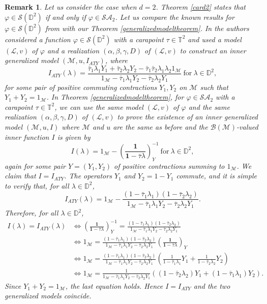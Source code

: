\documentclass[11pt, reqno]{amsart}
\newtheorem{remark}[theorem]{Remark}
\newcommand\1{\boldsymbol {1}}
\newcommand\be{\begin{equation}}
\newcommand\ee{\end{equation}}
\newcommand\m{\mathcal{M}}
\newcommand\lam{\lambda}
\newcommand{\T}{\mathbb{T}}
\newcommand{\D}{\mathbb{D}}
\newcommand{\ph}{\varphi}
\numberwithin{equation}{section}
\begin{document}
\begin{remark}\label{case-d=2} \rm Let us consider the case when $d=2$. Theorem \ref{card2} states that $\ph\in\mathcal{S}(\D^2)$ if and only if $\ph\in\mathcal{SA}_2$. Let us compare the known results for $\ph\in\mathcal{S}(\D^2)$ from \cite{ATY2} with our Theorem \ref{generalizedmodeltheorem}. In \cite[Theorem 3.6]{ATY2} the authors considered a function 
$\ph\in\mathcal{S}(\D^2)$ with a carapoint $\tau \in \T^2$  and used a model $(\mathcal{L},v)$ of $\varphi$ and a realization $(\alpha,\beta, \gamma, D)$ of $(\mathcal{L},v)$ to construct an inner generalized model $(\m,u,I_{ATY})$, where
\be\label{I1}
I_{ATY}(\lam) = \frac{\bar\tau_1\lam_1 Y_1+\bar\tau_2\lam_2 Y_2 - \bar\tau_1 \bar\tau_2 \lam_1\lam_2 1_\m}{1_\m-\bar\tau_1\lam_1 Y_2 - \bar\tau_2\lam_2 Y_1} \ \text{for}\ \lam\in\D^2,
\ee
for some pair of positive commuting contractions $Y_1,Y_2$ on $\m$ such that $Y_1+Y_2=1_\m$. In
Theorem \ref{generalizedmodeltheorem}, for $\ph\in\mathcal{SA}_2$ with a carapoint $\tau \in \T^2$, we can use the same model $(\mathcal{L},v)$ of $\varphi$ and the same realization $(\alpha,\beta, \gamma, D)$ of $(\mathcal{L},v)$ to prove
the existence of an inner generalized model $(\m,u,I)$ where $\m$ and $u$ are the same as before and  the $\mathcal{B}(\m)$-valued inner function $I$  is given by
\be\label{I2}
I(\lam) = 1_\m - \left(\frac{\1}{\1-\bar\tau \lam}\right)_Y^{-1} \ \text{for}\ \lam\in\D^2,
\ee
again for some pair $Y=(Y_1,Y_2)$ of positive contractions summing to $1_\m$.
We claim that $I=I_{ATY}$. The operators $Y_1$ and $Y_2=1-Y_1$ commute, and it is simple to verify that, for all $\lam\in\D^2 $, 
\be\label{I3}
I_{ATY}(\lam) = 1_\m - \frac{(1-\bar\tau_1\lam_1)(1-\bar\tau_2\lam_2)}{1_\m-\bar\tau_1\lam_1 Y_2 - \bar\tau_2\lam_2 Y_1}.
\ee
Therefore, for all $\lam\in\D^2 $,
\begin{align*}
I(\lam)=I_{ATY}(\lam) &\iff \left(\frac{\1}{\1-\bar\tau\lam}\right)_Y^{-1} = \frac{(1-\bar\tau_1\lam_1)(1-\bar\tau_2\lam_2)}{1_\m-\bar\tau_1\lam_1 Y_2 - \bar\tau_2\lam_2 Y_1}\ \\
&\iff 1_\m = \frac{(1-\bar\tau_1\lam_1)(1-\bar\tau_2\lam_2)}{1_\m-\bar\tau_1\lam_1 Y_2 - \bar\tau_2\lam_2 Y_1}\left(\frac{\1}{\1-\bar\tau\lam}\right)_Y\\
	&\iff 1_\m = \frac{(1-\bar\tau_1\lam_1)(1-\bar\tau_2\lam_2)}{1_\m-\bar\tau_1\lam_1 Y_2 - \bar\tau_2\lam_2 Y_1} \left(\frac{1}{1-\bar\tau_1\lam_1}Y_1 +\frac{1}{1-\bar\tau_2\lam_2}Y_2\right)\\
	&\iff  1_\m = \frac{1}{1_\m-\bar\tau_1\lam_1 Y_2 - \bar\tau_2\lam_2 Y_1} \left(
	(1-\bar\tau_2\lam_2)Y_1 +(1-\bar\tau_1\lam_1)Y_2\right).
\end{align*}
Since $Y_1+Y_2=1_\m$, the last equation holds.  Hence $I=I_{ATY}$ and the two generalized models coincide.
\end{remark}
\end{document}
